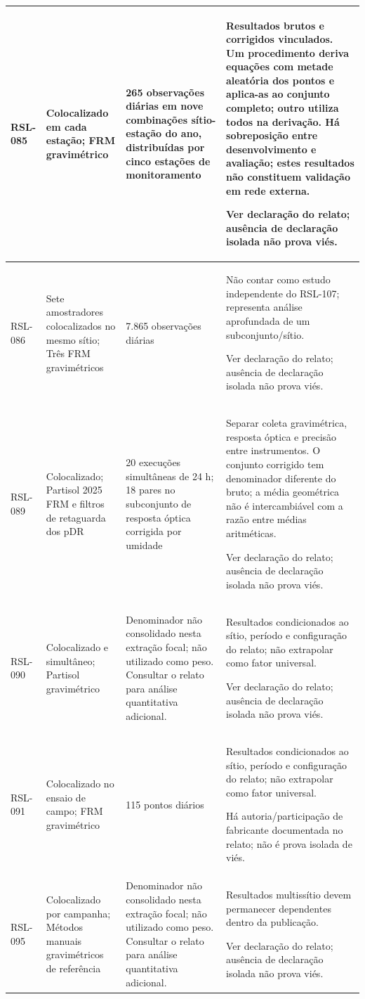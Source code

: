 \begin{longtable}{|P{0.12\textwidth}|P{0.28\textwidth}|P{0.28\textwidth}|P{\arrayrulewidth\relax}|}
RSL-085 & Colocalizado em cada estação; FRM gravimétrico & 265 observações diárias em nove combinações sítio-estação do ano, distribuídas por cinco estações de monitoramento & Resultados brutos e corrigidos vinculados. Um procedimento deriva equações com metade aleatória dos pontos e aplica-as ao conjunto completo; outro utiliza todos na derivação. Há sobreposição entre desenvolvimento e avaliação; estes resultados não constituem validação em rede externa.\par\medskip Ver declaração do relato; ausência de declaração isolada não prova viés.\\\hline
RSL-086 & Sete amostradores colocalizados no mesmo sítio; Três FRM gravimétricos & 7.865 observações diárias & Não contar como estudo independente do RSL-107; representa análise aprofundada de um subconjunto/sítio.\par\medskip Ver declaração do relato; ausência de declaração isolada não prova viés.\\\hline
RSL-089 & Colocalizado; Partisol 2025 FRM e filtros de retaguarda dos pDR & 20 execuções simultâneas de 24 h; 18 pares no subconjunto de resposta óptica corrigida por umidade & Separar coleta gravimétrica, resposta óptica e precisão entre instrumentos. O conjunto corrigido tem denominador diferente do bruto; a média geométrica não é intercambiável com a razão entre médias aritméticas.\par\medskip Ver declaração do relato; ausência de declaração isolada não prova viés.\\\hline
RSL-090 & Colocalizado e simultâneo; Partisol gravimétrico & Denominador não consolidado nesta extração focal; não utilizado como peso. Consultar o relato para análise quantitativa adicional. & Resultados condicionados ao sítio, período e configuração do relato; não extrapolar como fator universal.\par\medskip Ver declaração do relato; ausência de declaração isolada não prova viés.\\\hline
RSL-091 & Colocalizado no ensaio de campo; FRM gravimétrico & 115 pontos diários & Resultados condicionados ao sítio, período e configuração do relato; não extrapolar como fator universal.\par\medskip Há autoria/participação de fabricante documentada no relato; não é prova isolada de viés.\\\hline
RSL-095 & Colocalizado por campanha; Métodos manuais gravimétricos de referência & Denominador não consolidado nesta extração focal; não utilizado como peso. Consultar o relato para análise quantitativa adicional. & Resultados multissítio devem permanecer dependentes dentro da publicação.\par\medskip Ver declaração do relato; ausência de declaração isolada não prova viés.\\\hline

\end{longtable}
